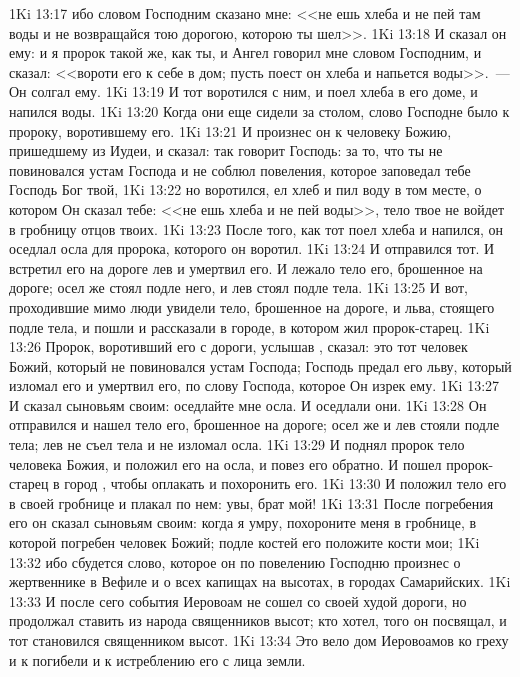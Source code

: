 \vs 1Ki 13:17 ибо словом Господним сказано мне: <<не ешь хлеба и не пей там воды и не возвращайся тою дорогою, которою ты шел>>.
\vs 1Ki 13:18 И сказал он ему: и я пророк такой же, как ты, и Ангел говорил мне словом Господним, и сказал: <<вороти его к себе в дом; пусть поест он хлеба и напьется воды>>.~--- Он солгал ему.
\vs 1Ki 13:19 И тот воротился с ним, и поел хлеба в его доме, и напился воды.
\vs 1Ki 13:20 Когда они еще сидели за столом, слово Господне было к пророку, воротившему его.
\vs 1Ki 13:21 И произнес он к человеку Божию, пришедшему из Иудеи, и сказал: так говорит Господь: за то, что ты не повиновался устам Господа и не соблюл повеления, которое заповедал тебе Господь Бог твой,
\vs 1Ki 13:22 но воротился, ел хлеб и пил воду в том месте, о котором Он сказал тебе: <<не ешь хлеба и не пей воды>>, тело твое не войдет в гробницу отцов твоих.
\vs 1Ki 13:23 После того, как тот поел хлеба и напился, он оседлал осла для пророка, которого он воротил.
\vs 1Ki 13:24 И отправился тот. И встретил его на дороге лев и умертвил его. И лежало тело его, брошенное на дороге; осел же стоял подле него, и лев стоял подле тела.
\vs 1Ki 13:25 И вот, проходившие мимо люди увидели тело, брошенное на дороге, и льва, стоящего подле тела, и пошли и рассказали в городе, в котором жил пророк-старец.
\vs 1Ki 13:26 Пророк, воротивший его с дороги, услышав , сказал: это тот человек Божий, который не повиновался устам Господа; Господь предал его льву, который изломал его и умертвил его, по слову Господа, которое Он изрек ему.
\vs 1Ki 13:27 И сказал сыновьям своим: оседлайте мне осла. И оседлали они.
\vs 1Ki 13:28 Он отправился и нашел тело его, брошенное на дороге; осел же и лев стояли подле тела; лев не съел тела и не изломал осла.
\vs 1Ki 13:29 И поднял пророк тело человека Божия, и положил его на осла, и повез его обратно. И пошел пророк-старец в город , чтобы оплакать и похоронить его.
\vs 1Ki 13:30 И положил тело его в своей гробнице и плакал по нем: увы, брат мой!
\vs 1Ki 13:31 После погребения его он сказал сыновьям своим: когда я умру, похороните меня в гробнице, в которой погребен человек Божий; подле костей его положите кости мои;
\vs 1Ki 13:32 ибо сбудется слово, которое он по повелению Господню произнес о жертвеннике в Вефиле и о всех капищах на высотах, в городах Самарийских.
\vs 1Ki 13:33 И после сего события Иеровоам не сошел со своей худой дороги, но продолжал ставить из народа священников высот; кто хотел, того он посвящал, и тот становился священником высот.
\vs 1Ki 13:34 Это вело дом Иеровоамов ко греху и к погибели и к истреблению его с лица земли.
